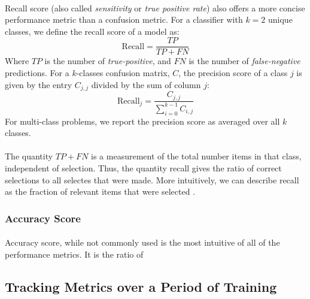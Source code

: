 \documentclass[12pt,letterpaper]{article}
\begin{document}
\paragraph*{}Recall score (also called \textit{sensitivity} or \textit{true positive rate}) also offers a more concise performance metric than a confusion metric. For a classifier with $k = 2$ unique classes, we define the recall score of a model as:
\begin{equation}
\label{eqn-BinaryRecall}
\text{Recall} = \frac{TP}{TP + FN}
\end{equation}
Where $TP$ is the number of \textit{true-positive}, and $FN$ is the number of \textit{false-negative} predictions. For a $k$-classes confusion matrix, $C$, the precision score of a class $j$ is given by the entry $C_{j,j}$ divided by the sum of column $j$:
\begin{equation}
\label{eqn-KRecall}
\text{Recall}_j = \frac{C_{j,j}}{\sum_{i=0}^{k-1}C_{i,j}}
\end{equation}
For multi-class problems, we report the precision score as averaged over all $k$ classes.

\paragraph*{}The quantity $TP + FN$ is a measurement of the total number items in that class, independent of selection. Thus, the quantity recall gives the ratio of correct selections to all selectes that were made. More intuitively, we can describe recall as the fraction of relevant items that were selected \cite{Geron}. 


\subsubsection{Accuracy Score}

\paragraph*{}Accuracy score, while not commonly used is the most intuitive of all of the performance metrics. It is the ratio of 


\subsection{Tracking Metrics over a Period of Training}
\label{subsec-TrainingMetrics}
\end{document}
